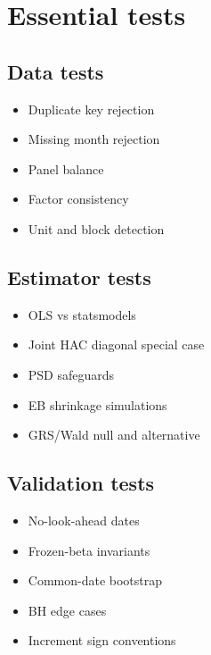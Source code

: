 \hypertarget{essential-tests}{%
\section{Essential tests}\label{essential-tests}}

\hypertarget{data-tests}{%
\subsection{Data tests}\label{data-tests}}

\begin{itemize}
\tightlist
\item
  Duplicate key rejection
\item
  Missing month rejection
\item
  Panel balance
\item
  Factor consistency
\item
  Unit and block detection
\end{itemize}

\hypertarget{estimator-tests}{%
\subsection{Estimator tests}\label{estimator-tests}}

\begin{itemize}
\tightlist
\item
  OLS vs statsmodels
\item
  Joint HAC diagonal special case
\item
  PSD safeguards
\item
  EB shrinkage simulations
\item
  GRS/Wald null and alternative
\end{itemize}

\hypertarget{validation-tests}{%
\subsection{Validation tests}\label{validation-tests}}

\begin{itemize}
\tightlist
\item
  No-look-ahead dates
\item
  Frozen-beta invariants
\item
  Common-date bootstrap
\item
  BH edge cases
\item
  Increment sign conventions
\end{itemize}

